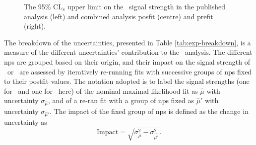 \begin{figure}[h!]
    \caption{The 95\% CL$_s$ upper limit on the \vhc\ signal strength in the published analysis (left) and combined analysis posfit (centre) and prefit (right).}
    \label{fig:postfit_ptv}
\end{figure} 

The breakdown of the uncertainties, presented in Table \ref{tab:exp-breakdown}, is a measure of the different uncertainties' contribution to the \vhbc\ analysis. The different \gls{np}s are grouped based on their origin, and their impact on the signal strength of \vhb\ or \vhc\ are assessed by iteratively re-running fits with successive groups of \gls{np}s fixed to their postfit values. The notation adopted is to label the signal strengths (one for \vhb\ and one for \vhc\ here) of the nominal maximal likelihood fit as $\hat{\mu}$ with uncertainty $\sigma_{\hat{\mu}}$, and of a re-ran fit with a group of \gls{np}s fixed as $\hat{\mu}'$ with uncertainty $\sigma_{\hat{\mu}'}$. The impact of the fixed group of \gls{np}s is defined as the change in uncertainty as 
\begin{equation}
    \text{Impact} = \sqrt{\sigma^2_{\hat{\mu}} - \sigma^2_{\hat{\mu'}}}.
\end{equation}

